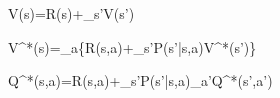 V(s)=R(s)+\gamma\max_{s'}V(s')

V^*(s)=\max_a\{R(s,a)+\gamma\sum_{s'}P(s'|s,a)V^*(s')\}

Q^*(s,a)=R(s,a)+\gamma\sum_{s'}P(s'|s,a)\max_{a'}Q^*(s',a')
